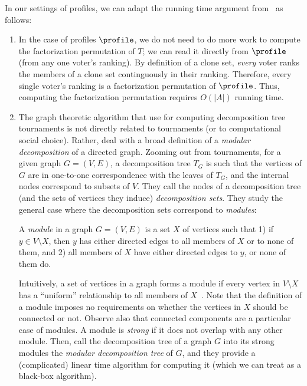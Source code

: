In our settings of profiles, we can adapt the running time argument from~\citep{Brandt18:Extending} as follows:
\begin{enumerate}
    \item In the case of profiles $\profile$, we do not need to do more work to compute the factorization permutation of $T$; we can read it directly from $\profile$ (from any one voter's ranking).
    By definition of a clone set, \emph{every} voter ranks the members of a clone set continguously in their ranking. 
    Therefore, every single voter's ranking is a factorization permutation of $\profile$.
    Thus, computing the factorization permutation requires $O(|A|)$ running time.
    \item The graph theoretic algorithm \citet{Capelle02:Graph} that \citet{Brandt18:Extending} use for computing decomposition tree tournaments is not directly related to tournaments (or to computational social choice).
    Rather, \citet{Capelle02:Graph} deal with a broad definition of a \emph{modular decomposition} of a directed graph.
    Zooming out from tournaments, for a given graph $G=(V, E)$, a decomposition tree $T_G$ is such that the vertices of $G$ are in one-to-one correspondence with the leaves of $T_G$, and the internal nodes correspond to subsets of $V$.
    They call the nodes of
    a decomposition tree (and the sets of vertices they induce) \emph{decomposition sets}.
    They study the general case where the decomposition sets correspond to \emph{modules}: 
    \begin{definition}
        A \emph{module} in a graph $G = (V, E)$ is a set $X$ of vertices such that 1) if $y \in V \setminus X$, then $y$ has either directed edges to all members of $X$ or to none of them, and 2) all members of $X$ have either directed edges to $y$, or none of them do.
    \end{definition}
    Intuitively, a set of vertices in a graph forms a module if every vertex in $V \setminus X$ has a ``uniform'' relationship to all members of $X$~\citep{McConnell05:Linear}.
    Note that the definition of a module imposes no requirements on whether the vertices in $X$ should be connected or not.
    Observe also that connected components are a particular case of modules.
    A module is \emph{strong} if it does not overlap with any other module.
    Then, \citet{Capelle02:Graph} call the decomposition tree of a graph $G$ into its strong modules the \emph{modular decomposition tree} of $G$, and they provide a (complicated) linear time algorithm for computing it (which we can treat as a black-box algorithm).
    

\end{enumerate}
